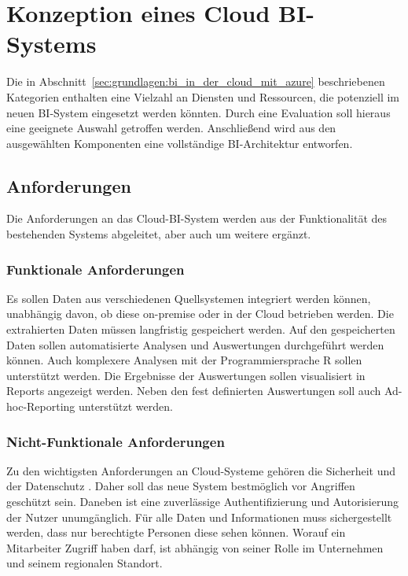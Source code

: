 \chapter{Konzeption eines Cloud BI-Systems}
\label{ch:konzeption}
Die in Abschnitt~\ref{sec:grundlagen:bi_in_der_cloud_mit_azure} beschriebenen Kategorien enthalten eine Vielzahl an Diensten und Ressourcen, die potenziell im neuen BI-System eingesetzt werden könnten. Durch eine Evaluation soll hieraus eine geeignete Auswahl getroffen werden. Anschließend wird aus den ausgewählten Komponenten eine vollständige BI-Architektur entworfen.

\section{Anforderungen}
\label{sec:anforderungen}
Die Anforderungen an das Cloud-BI-System werden aus der Funktionalität des bestehenden Systems abgeleitet, aber auch um weitere ergänzt.

\subsection{Funktionale Anforderungen}
\label{subsec:funktionaleAnforderungen}
Es sollen Daten aus verschiedenen Quellsystemen integriert werden können, unabhängig davon, ob diese on-premise oder in der Cloud betrieben werden. Die extrahierten Daten müssen langfristig gespeichert werden. Auf den gespeicherten Daten sollen automatisierte Analysen und Auswertungen durchgeführt werden können. Auch komplexere Analysen mit der Programmiersprache R sollen unterstützt werden. Die Ergebnisse der Auswertungen sollen visualisiert in Reports angezeigt werden. Neben den fest definierten Auswertungen soll auch Ad-hoc-Reporting unterstützt werden.

\subsection{Nicht-Funktionale Anforderungen}
\label{subsec:NichtfunktionaleAnforderungen}
Zu den wichtigsten Anforderungen an Cloud-Systeme gehören die Sicherheit und der Datenschutz \cite{gurjar_cloud_2013}. Daher soll das neue System bestmöglich vor Angriffen geschützt sein. Daneben ist eine zuverlässige Authentifizierung und Autorisierung der Nutzer unumgänglich. Für alle Daten und Informationen muss sichergestellt werden, dass nur berechtigte Personen diese sehen können. Worauf ein Mitarbeiter Zugriff haben darf, ist abhängig von seiner Rolle im Unternehmen und seinem regionalen Standort.

